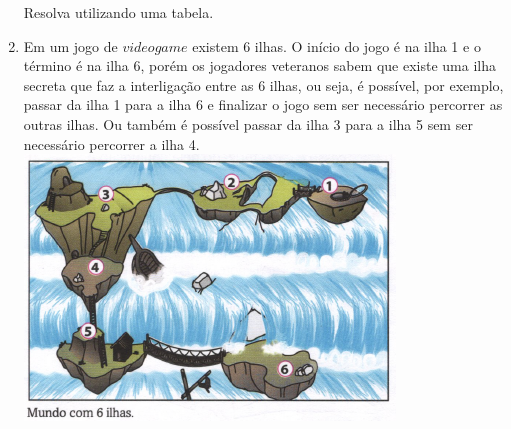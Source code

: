 \documentclass[a4paper,14pt]{article}
\begin{document}
\begin{multicols}{2}
\begin{enumerate}
			Resolva utilizando uma tabela. \newpage
			\item Em um jogo de $video game$ existem 6 ilhas. O início do jogo é na ilha 1 e o término é na ilha 6, porém os jogadores veteranos sabem que existe uma ilha secreta que faz a interligação entre as 6 ilhas, ou seja, é possível, por exemplo, passar da ilha 1 para a ilha 6 e finalizar o jogo sem ser necessário percorrer as outras ilhas. Ou também é possível passar da ilha 3 para a ilha 5 sem ser necessário percorrer a ilha 4. \\
			\includegraphics[width=1\linewidth]{6FMA113_imagens/imagem1}
			

\end{enumerate}
\end{multicols}
\end{document}
